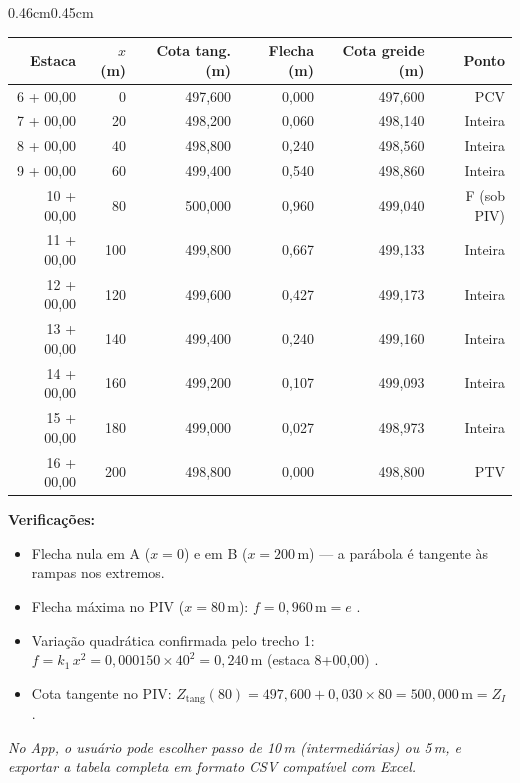 \documentclass[12pt,letterpaper]{article}
\newenvironment{corpo}{\begin{adjustwidth}{0.46cm}{0.45cm}\justifying}{\end{adjustwidth}}
\begin{document}
\begin{corpo}
\begin{center}
\small
\begin{tabular}{rrrrrr}
\toprule
\textbf{Estaca} & \textbf{\boldmath$x$ (m)} & \textbf{Cota tang. (m)} & \textbf{Flecha (m)} & \textbf{Cota greide (m)} & \textbf{Ponto} \\
\midrule
6 + 00,00 &   0 & 497,600 & 0,000 & 497,600 & PCV \\
7 + 00,00 &  20 & 498,200 & 0,060 & 498,140 & Inteira \\
8 + 00,00 &  40 & 498,800 & 0,240 & 498,560 & Inteira \\
9 + 00,00 &  60 & 499,400 & 0,540 & 498,860 & Inteira \\
10 + 00,00 & 80 & 500,000 & 0,960 & 499,040 & F (sob PIV) \\
11 + 00,00 & 100 & 499,800 & 0,667 & 499,133 & Inteira \\
12 + 00,00 & 120 & 499,600 & 0,427 & 499,173 & Inteira \\
13 + 00,00 & 140 & 499,400 & 0,240 & 499,160 & Inteira \\
14 + 00,00 & 160 & 499,200 & 0,107 & 499,093 & Inteira \\
15 + 00,00 & 180 & 499,000 & 0,027 & 498,973 & Inteira \\
16 + 00,00 & 200 & 498,800 & 0,000 & 498,800 & PTV \\
\bottomrule
\end{tabular}
\end{center}

\textbf{Verificações:}
\begin{itemize}
  \item Flecha nula em A ($x=0$) e em B ($x=200\,\text{m}$) — a parábola é tangente às rampas nos extremos.
  \item Flecha máxima no PIV ($x=80\,\text{m}$): $f = 0{,}960\,\text{m} = e$ \checkmark.
  \item Variação quadrática confirmada pelo trecho 1: $f = k_1\,x^2 = 0{,}000150 \times 40^2 = 0{,}240\,\text{m}$ (estaca 8+00,00) \checkmark.
  \item Cota tangente no PIV: $Z_{\mathrm{tang}}(80) = 497{,}600 + 0{,}030 \times 80 = 500{,}000\,\text{m} = Z_I$ \checkmark.
\end{itemize}

\textit{No App, o usuário pode escolher passo de 10\,m (intermediárias) ou 5\,m, e exportar a tabela completa em formato CSV compatível com Excel.}
\end{corpo}

\newpage
\end{document}
